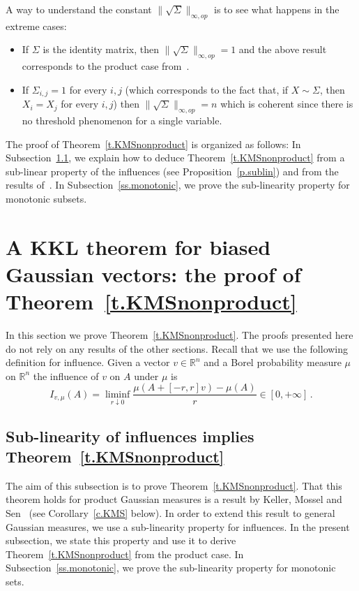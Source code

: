 \documentclass[11pt]{article}
\theoremstyle{definition}
\numberwithin{equation}{section}
\newcommand{\R}{\mathbb{R}}
\begin{document}
A way to understand the constant $\| \sqrt{\Sigma} \|_{\infty,op}$ is to see what happens in the extreme cases:
\begin{itemize}
\item If $\Sigma$ is the identity matrix, then $\| \sqrt{\Sigma} \|_{\infty,op}=1$ and the above result corresponds to the product case from~\cite{keller2012geometric}.
\item If $\Sigma_{i,j}=1$ for every $i,j$ (which corresponds to the fact that, if $X \sim \Sigma$, then $X_i=X_j$ for every $i,j$) then $\| \sqrt{\Sigma} \|_{\infty,op}=n$ which is coherent since there is no threshold phenomenon for a single variable.
\end{itemize}

The proof of Theorem~\ref{t.KMSnonproduct} is organized as follows: In Subsection~\ref{ss.KMSnonproduct}, we explain how to deduce Theorem~\ref{t.KMSnonproduct} from a sub-linear property of the influences (see Proposition~\ref{p.sublin}) and from the results of~\cite{keller2012geometric}. In Subsection~\ref{ss.monotonic}, we prove the sub-linearity property for monotonic subsets.
\setcounter{section}{4}
\section{A KKL theorem for biased Gaussian vectors: the proof of Theorem~\ref{t.KMSnonproduct}}\label{s.KMS}

In this section we prove Theorem~\ref{t.KMSnonproduct}. The proofs presented here do not rely on any results of the other sections. Recall that we use the following definition for influence. Given a vector $v\in\R^n$ and a Borel probability measure $\mu$ on $\R^n$ the influence of $v$ on $A$ under $\mu$ is
\[
I_{v,\mu}(A)=\underset{r \downarrow 0}{\liminf}\frac{\mu \left(A+[-r,r]v \right) - \mu \left(A \right)}{r} \in [0,+\infty]\,.
\]
\subsection{Sub-linearity of influences implies Theorem~\ref{t.KMSnonproduct}}\label{ss.KMSnonproduct}

The aim of this subsection is to prove Theorem~\ref{t.KMSnonproduct}. That this theorem holds for product Gaussian measures is a result by Keller, Mossel and Sen~\cite{keller2012geometric} (see Corollary~\ref{c.KMS} below). In order to extend this result to general Gaussian measures, we use a sub-linearity property for influences. In the present subsection, we state this property and use it to derive Theorem~\ref{t.KMSnonproduct} from the product case. In Subsection~\ref{ss.monotonic}, we prove the sub-linearity property for monotonic sets.
\end{document}
